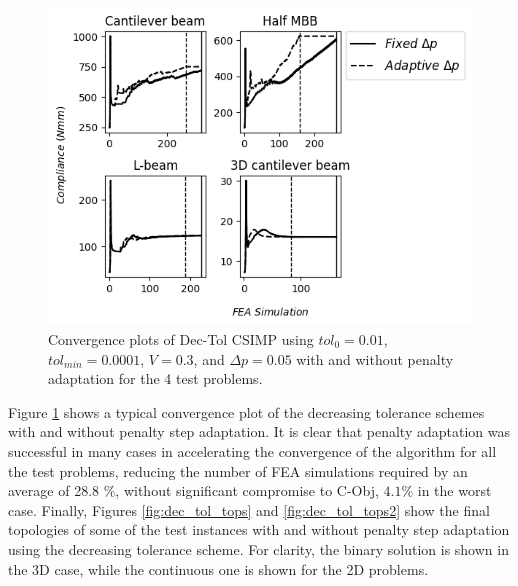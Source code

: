   
  

  \begin{figure}
    \centering
    \includegraphics[width=\textwidth]{images/adaptive_csimp/convplots_dec_tol_csimp_03_0001_80_001_ip.png}
    \caption{Convergence plots of Dec-Tol CSIMP using $tol_0 = 0.01$, $tol_{min} = 0.0001$, $V = 0.3$, and $\Delta p = 0.05$ with and without penalty adaptation for the 4 test problems.}
    \label{fig:dec_tol_convplots}
  \end{figure}

  Figure \ref{fig:dec_tol_convplots} shows a typical convergence plot of the decreasing tolerance schemes with and without penalty step adaptation. It is clear that penalty adaptation was successful in many cases in accelerating the convergence of the algorithm for all the test problems, reducing the number of FEA simulations required by an average of 28.8 \%, without significant compromise to C-Obj, $4.1\%$ in the worst case. Finally, Figures \ref{fig:dec_tol_tops} and \ref{fig:dec_tol_tops2} show the final topologies of some of the test instances with and without penalty step adaptation using the decreasing tolerance scheme. For clarity, the binary solution is shown in the 3D case, while the continuous one is shown for the 2D problems.

